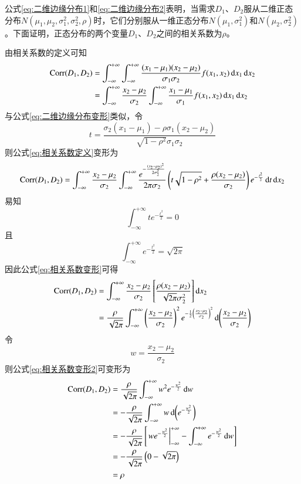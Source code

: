 公式\ref{eq:二维边缘分布1}和\ref{eq:二维边缘分布2}表明，当需求$D_1$、$D_2$服从二维正态分布$N(\mu_1,\mu_2,\sigma_1^2,\sigma_2^2,\rho)$时，它们分别服从一维正态分布$N(\mu_1,\sigma_1^2)$和$N(\mu_2,\sigma_2^2)$。下面证明，正态分布的两个变量$D_1$、$D_2$之间的相关系数为$\rho$。

由相关系数的定义可知
\begin{align}
\operatorname{Corr}(D_1,D_2) &= \int_{-\infty}^{+\infty}\int_{-\infty}^{+\infty}\frac{(x_1-\mu_1)(x_2-\mu_2)}{\sigma_1\sigma_2}f(x_1,x_2)\operatorname{d\!} x_1\operatorname{d\!} x_2 \notag\\
&= \int_{-\infty}^{+\infty}\frac{x_2-\mu_2}{\sigma_2}\int_{-\infty}^{+\infty}\frac{x_1-\mu_1}{\sigma_1}f(x_1,x_2)\operatorname{d\!} x_1\operatorname{d\!} x_2
\label{eq:相关系数定义}
\end{align}
与公式\ref{eq:二维边缘分布变形}类似，令
\[
t = \frac{\sigma_2(x_1-\mu_1)-\rho\sigma_1(x_2-\mu_2)}{\sqrt{1-\rho^2}\sigma_1\sigma_2}
\]
则公式\ref{eq:相关系数定义}变形为
\begin{equation}
\operatorname{Corr}(D_1,D_2) = \int_{-\infty}^{+\infty}\frac{x_2-\mu_2}{\sigma_2}\int_{-\infty}^{+\infty}\frac{e^{-\frac{(x_2-\mu_2)^2}{2\sigma_2^2}}}{2\pi\sigma_2}\left(t\sqrt{1-\rho^2}+\frac{\rho(x_2-\mu_2)}{\sigma_2}\right)e^{-\frac{t^2}{2}}\operatorname{d\!} t\operatorname{d\!} x_2
\label{eq:相关系数变形}
\end{equation}
易知
\[
\int_{-\infty}^{+\infty}te^{-\frac{t^2}{2}} = 0
\]
且
\[
\int_{-\infty}^{+\infty}e^{-\frac{t^2}{2}} = \sqrt{2\pi}
\]
因此公式\ref{eq:相关系数变形}可得
\begin{align}
\operatorname{Corr}(D_1,D_2) &= \int_{-\infty}^{+\infty}\frac{x_2-\mu_2}{\sigma_2}\left[\frac{\rho(x_2-\mu_2)}{\sqrt{2\pi}\sigma_2^2}\right]\operatorname{d\!} x_2 \notag\\
&= \frac{\rho}{\sqrt{2\pi}}\int_{-\infty}^{+\infty}\left(\frac{x_2-\mu_2}{\sigma_2}\right)^2e^{-\frac{1}{2}\left(\frac{x_2-\mu_2}{\sigma_2}\right)^2}\operatorname{d\!} \left(\frac{x_2-\mu_2}{\sigma_2}\right)
\label{eq:相关系数变形2}
\end{align}
令
\[
w = \frac{x_2-\mu_2}{\sigma_2}
\]
则公式\ref{eq:相关系数变形2}可变形为
\begin{align}
\operatorname{Corr}(D_1,D_2) &= \frac{\rho}{\sqrt{2\pi}}\int_{-\infty}^{+\infty}w^2e^{-\frac{w^2}{2}}\operatorname{d\!} w \notag\\
&= -\frac{\rho}{\sqrt{2\pi}}\int_{-\infty}^{+\infty}w\operatorname{d\!} \left(e^{-\frac{w^2}{2}}\right) \notag\\
&= -\frac{\rho}{\sqrt{2\pi}}\left[\left.we^{-\frac{w^2}{2}}\right|_{-\infty}^{+\infty}-\int_{-\infty}^{+\infty}e^{-\frac{w^2}{2}}\operatorname{d\!} w\right] \notag\\
&= -\frac{\rho}{\sqrt{2\pi}}\left(0-\sqrt{2\pi}\right) \notag\\
&= \rho
\label{eq:相关系数结果}
\end{align}


